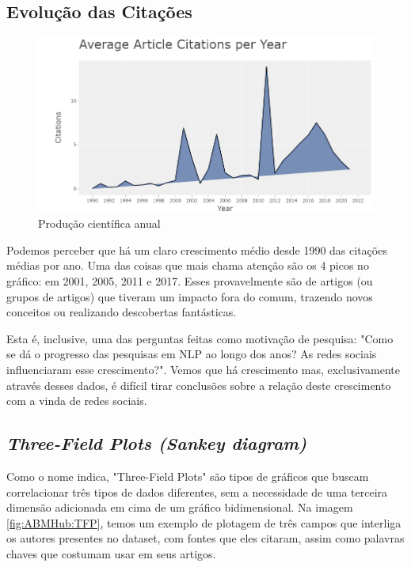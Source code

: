 \subsection{Evolução das Citações}

 \begin{figure}
    \centering
    \includegraphics[width=1\textwidth]{experiments/ABMHub/PesquisaBibliometrica/NLP/citationsPerYear.png}
    \caption{Produção científica anual}
    \label{fig:ABMHub:CPY}
\end{figure}

Podemos perceber que há um claro crescimento médio desde 1990 das citações médias por ano. Uma das coisas que mais chama atenção são os 4 picos no gráfico: em 2001, 2005, 2011 e 2017. Esses provavelmente são de artigos (ou grupos de artigos) que tiveram um impacto fora do comum, trazendo novos conceitos ou realizando descobertas fantásticas.

Esta é, inclusive, uma das perguntas feitas como motivação de pesquisa: "Como se dá o progresso das pesquisas em NLP ao longo dos anos? As redes sociais influenciaram esse crescimento?". Vemos que há crescimento mas, exclusivamente através desses dados, é difícil tirar conclusões sobre a relação deste crescimento com a vinda de redes sociais. 

\subsection{\textit{Three-Field Plots (Sankey diagram)}}

Como o nome indica, "Three-Field Plots" são tipos de gráficos que buscam correlacionar três tipos de dados diferentes, sem a necessidade de uma terceira dimensão adicionada em cima de um gráfico bidimensional. Na imagem \ref{fig:ABMHub:TFP}, temos um exemplo de plotagem de três campos que interliga os autores presentes no dataset, com fontes que eles citaram, assim como palavras chaves que costumam usar em seus artigos. 


